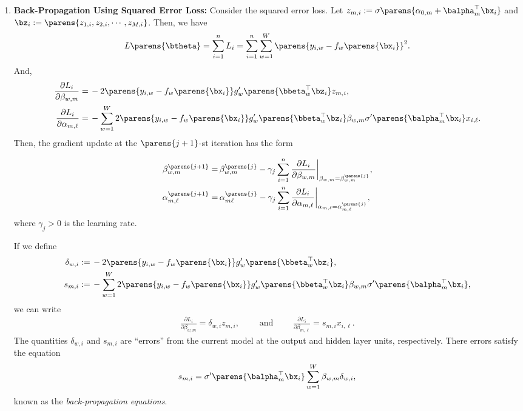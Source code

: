 \documentclass[12pt]{article}
\begin{document}
\begin{enumerate}[label=\textbf{\arabic*.}]
	\item \textbf{Back-Propagation Using Squared Error Loss:} Consider the squared error loss. Let $z_{m,i} := \sigma \parens{\alpha_{0,m} + \balpha_m^\top \bx_i}$ and $\bz_i := \parens{z_{1,i}, z_{2,i}, \cdots, z_{M,i}}$. Then, we have 
	\begin{align*}
		L \parens{\btheta} = \sum_{i=1}^n L_i = \sum_{i=1}^n \sum_{w=1}^W \parens{y_{i,w} - f_w \parens{\bx_i}}^2. 
	\end{align*}
	And, 
	\begin{align*}
		\frac{\partial L_i}{\partial \beta_{w,m}} = & \, -2 \parens{y_{i,w} - f_w \parens{\bx_i}} g_w' \parens{\bbeta_w^\top \bz_i} z_{m,i}, \\ 
		\frac{\partial L_i}{\partial \alpha_{m,\ell}} = & \, - \sum_{w=1}^W 2 \parens{y_{i,w} - f_w \parens{\bx_i}} g_w' \parens{\bbeta_w^\top \bz_i} \beta_{w,m} \sigma' \parens{\balpha_m^\top \bx_i} x_{i,\ell}. 
	\end{align*}
	Then, the gradient update at the $\parens{j+1}$-st iteration has the form 
	
	\begin{equation}\label{grad.updates}
		\begin{aligned}
			\beta_{w,m}^{\parens{j+1}} = & \, \beta_{w,m}^{\parens{j}} - \gamma_j \sum_{i=1}^n \frac{\partial L_i}{\partial \beta_{w,m}} \bigg\vert_{\beta_{w,m} = \beta_{w,m}^{\parens{j}}}, \\ 
			\alpha_{m,\ell}^{\parens{j+1}} = & \, \alpha_{m\ell}^{\parens{j}} - \gamma_j \sum_{i=1}^n \frac{\partial L_i}{\partial \alpha_{m,\ell}} \bigg\vert_{\alpha_{m,\ell} = \alpha_{m,\ell}^{\parens{j}}}, 
		\end{aligned}
	\end{equation}
	where $\gamma_j > 0$ is the learning rate. 
	
	If we define 
	\begin{align*}
		\delta_{w,i} := & \, -2 \parens{y_{i,w} - f_w \parens{\bx_i}} g_w' \parens{\bbeta_w^\top \bz_i}, \\ 
		s_{m,i} := & \, - \sum_{w=1}^W 2 \parens{y_{i,w} - f_w \parens{\bx_i}} g_w' \parens{\bbeta_w^\top \bz_i} \beta_{w,m} \sigma' \parens{\balpha_m^\top \bx_i}, 
	\end{align*}
	we can write 
	\begin{align}
		\frac{\partial L_i}{\partial \beta_{w,m}} = \delta_{w,i} z_{m,i}, \qquad \text{ and } \qquad \frac{\partial L_i}{\partial \beta_{m,\ell}} = s_{m,i} x_{i,\ell}. 
	\end{align}
	The quantities $\delta_{w,i}$ and $s_{m,i}$ are ``errors'' from the current model at the output and hidden layer units, respectively. There errors satisfy the equation 
	\begin{align}\label{back.prop}
		s_{m,i} = \sigma' \parens{\balpha_m^\top \bx_i} \sum_{w=1}^W \beta_{w,m} \delta_{w,i}, 
	\end{align}
	known as the \textit{back-propagation equations}. 
	

\end{enumerate}
\end{document}
